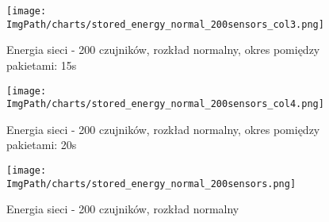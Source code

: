 \begin{figure}[H]
	\begin{center}
		\texttt{[image: \\ImgPath/charts/stored\_energy\_normal\_200sensors\_col3.png]}
	\end{center}
	\caption{Energia sieci - 200 czujników, rozkład normalny, okres pomiędzy pakietami: 15s}
\end{figure}

\begin{figure}[H]
	\begin{center}
		\texttt{[image: \\ImgPath/charts/stored\_energy\_normal\_200sensors\_col4.png]}
	\end{center}
	\caption{Energia sieci - 200 czujników, rozkład normalny, okres pomiędzy pakietami: 20s}
\end{figure}

\begin{figure}[H]
	\begin{center}
		\texttt{[image: \\ImgPath/charts/stored\_energy\_normal\_200sensors.png]}
	\end{center}
	\caption{Energia sieci - 200 czujników, rozkład normalny}
\end{figure}